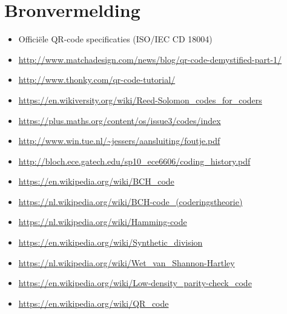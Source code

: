 \documentclass[a4paper]{article}
\begin{document}
\section{Bronvermelding}
\begin{itemize}
\item Officiële QR-code specificaties (ISO/IEC CD 18004)
\item \url{http://www.matchadesign.com/news/blog/qr-code-demystified-part-1/}
\item \url{http://www.thonky.com/qr-code-tutorial/}
\item \url{https://en.wikiversity.org/wiki/Reed-Solomon_codes_for_coders}
\item \url{https://plus.maths.org/content/os/issue3/codes/index}
\item \url{http://www.win.tue.nl/~jessers/aansluiting/foutje.pdf}
\item \url{http://bloch.ece.gatech.edu/sp10_ece6606/coding_history.pdf}
\item \url{https://en.wikipedia.org/wiki/BCH_code}
\item \url{https://nl.wikipedia.org/wiki/BCH-code_(coderingstheorie)}
\item \url{https://nl.wikipedia.org/wiki/Hamming-code}
\item \url{https://en.wikipedia.org/wiki/Synthetic_division}
\item \url{https://nl.wikipedia.org/wiki/Wet_van_Shannon-Hartley}
\item \url{https://en.wikipedia.org/wiki/Low-density_parity-check_code}
\item \url{https://en.wikipedia.org/wiki/QR_code}
\end{itemize}
\end{document}
